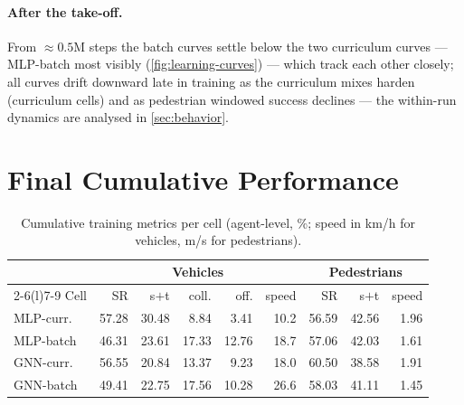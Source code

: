 \paragraph{After the take-off.}
From $\approx 0.5$M steps the batch curves settle below the two
curriculum curves --- MLP-batch most visibly
(\cref{fig:learning-curves}) --- which track each
other closely; all curves drift downward late in training as the
curriculum mixes harden (curriculum cells) and as pedestrian windowed
success declines --- the within-run dynamics are analysed in
\cref{sec:behavior}.

\section{Final Cumulative Performance}
\label{sec:final-performance}

\begin{table}[t]
  \centering\small
  \caption{Cumulative training metrics per cell (agent-level, \%;
  speed in km/h for vehicles, m/s for pedestrians).}
  \label{tab:cumulative}
  \begin{tabular}{@{}lrrrrrrrr@{}}
    \toprule
    & \multicolumn{5}{c}{Vehicles} & \multicolumn{3}{c}{Pedestrians} \\
    \cmidrule(lr){2-6}\cmidrule(l){7-9}
    Cell & SR & s$+$t & coll. & off. & speed & SR & s$+$t & speed \\
    \midrule
    MLP-curr.\ & 57.28 & 30.48 & 8.84 & 3.41 & 10.2 & 56.59 & 42.56 & 1.96 \\
    MLP-batch  & 46.31 & 23.61 & 17.33 & 12.76 & 18.7 & 57.06 & 42.03 & 1.61 \\
    GNN-curr.\ & 56.55 & 20.84 & 13.37 & 9.23 & 18.0 & 60.50 & 38.58 & 1.91 \\
    GNN-batch  & 49.41 & 22.75 & 17.56 & 10.28 & 26.6 & 58.03 & 41.11 & 1.45 \\
    \bottomrule
  \end{tabular}
\end{table}

